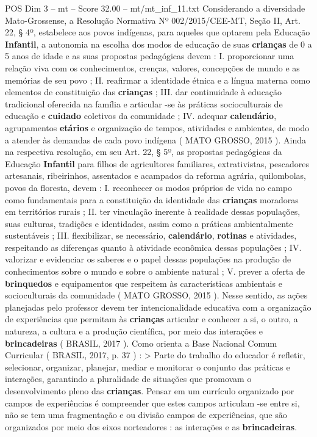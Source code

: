 \begin{textsample}{POS Dim 3 – mt – Score 32.00 – mt/mt\_inf\_11.txt}
Considerando a diversidade Mato-Grossense, a Resolução Normativa Nº 002/2015/CEE-MT, Seção II, Art. 22, § 4º, estabelece aos povos indígenas, para aqueles que optarem pela Educação \textbf{Infantil}, a autonomia na escolha dos modos de educação de suas \textbf{crianças} de 0 a 5 anos de idade e as suas propostas pedagógicas devem : I. proporcionar uma relação viva com os conhecimentos, crenças, valores, concepções de mundo e as memórias de seu povo ; II. reafirmar a identidade étnica e a língua materna como elementos de constituição das \textbf{crianças} ; III. dar continuidade à educação tradicional oferecida na família e articular -se às práticas socioculturais de educação e \textbf{cuidado} coletivos da comunidade ; IV. adequar \textbf{calendário}, agrupamentos \textbf{etários} e organização de tempos, atividades e ambientes, de modo a atender às demandas de cada povo indígena ( MATO GROSSO, 2015 ).
Ainda na respectiva resolução, em seu Art. 22, § 5º, as propostas pedagógicas da Educação \textbf{Infantil} para filhos de agricultores familiares, extrativistas, pescadores artesanais, ribeirinhos, assentados e acampados da reforma agrária, quilombolas, povos da floresta, devem : I. reconhecer os modos próprios de vida no campo como fundamentais para a constituição da identidade das \textbf{crianças} moradoras em territórios rurais ; II. ter vinculação inerente à realidade dessas populações, suas culturas, tradições e identidades, assim como a práticas ambientalmente sustentáveis ; III. flexibilizar, se necessário, \textbf{calendário}, \textbf{rotinas} e atividades, respeitando as diferenças quanto à atividade econômica dessas populações ; IV. valorizar e evidenciar os saberes e o papel dessas populações na produção de conhecimentos sobre o mundo e sobre o ambiente natural ; V. prever a oferta de \textbf{brinquedos} e equipamentos que respeitem às características ambientais e socioculturais da comunidade ( MATO GROSSO, 2015 ).
Nesse sentido, as ações planejadas pelo professor devem ter intencionalidade educativa com a organização de experiências que permitam às \textbf{crianças} articular e conhecer a si, o outro, a natureza, a cultura e a produção científica, por meio das interações e \textbf{brincadeiras} ( BRASIL, 2017 ).
Como orienta a Base Nacional Comum Curricular ( BRASIL, 2017, p. 37 ) : > Parte do trabalho do educador é refletir, selecionar, organizar, planejar, mediar e monitorar o conjunto das práticas e interações, garantindo a pluralidade de situações que promovam o desenvolvimento pleno das \textbf{crianças}.
Pensar em um currículo organizado por campos de experiências é compreender que estes campos articulam -se entre si, não se tem uma fragmentação e ou divisão campos de experiências, que são organizados por meio dos eixos norteadores : as interações e as \textbf{brincadeiras}.

\end{textsample}
